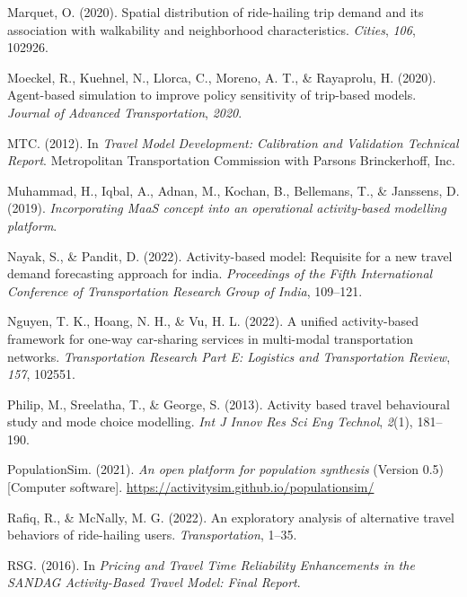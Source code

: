 \documentclass[simple, masters, twoside]{byuthesis}
\newlength{\cslhangindent}
\newlength{\cslentryspacingunit} %
\newenvironment{CSLReferences}[2] %
 {%
  \setlength{\parindent}{0pt}
  \ifodd #1
  \let\oldpar\par
  \def\par{\hangindent=\cslhangindent\oldpar}
  \fi
  \setlength{\parskip}{#2\cslentryspacingunit}
 }%
 {}
\begin{document}
\begin{CSLReferences}{1}{0}
\leavevmode{}%
Marquet, O. (2020). Spatial distribution of ride-hailing trip demand and its association with walkability and neighborhood characteristics. \emph{Cities}, \emph{106}, 102926.

\leavevmode{}%
Moeckel, R., Kuehnel, N., Llorca, C., Moreno, A. T., \& Rayaprolu, H. (2020). Agent-based simulation to improve policy sensitivity of trip-based models. \emph{Journal of Advanced Transportation}, \emph{2020}.

\leavevmode{}%
MTC. (2012). In \emph{Travel Model Development: Calibration and Validation Technical Report}. Metropolitan Transportation Commission with Parsons Brinckerhoff, Inc.

\leavevmode{}%
Muhammad, H., Iqbal, A., Adnan, M., Kochan, B., Bellemans, T., \& Janssens, D. (2019). \emph{Incorporating MaaS concept into an operational activity-based modelling platform}.

\leavevmode{}%
Nayak, S., \& Pandit, D. (2022). Activity-based model: Requisite for a new travel demand forecasting approach for india. \emph{Proceedings of the Fifth International Conference of Transportation Research Group of India}, 109--121.

\leavevmode{}%
Nguyen, T. K., Hoang, N. H., \& Vu, H. L. (2022). A unified activity-based framework for one-way car-sharing services in multi-modal transportation networks. \emph{Transportation Research Part E: Logistics and Transportation Review}, \emph{157}, 102551.

\leavevmode{}%
Philip, M., Sreelatha, T., \& George, S. (2013). Activity based travel behavioural study and mode choice modelling. \emph{Int J Innov Res Sci Eng Technol}, \emph{2}(1), 181--190.

\leavevmode{}%
PopulationSim. (2021). \emph{An open platform for population synthesis} (Version 0.5) {[}Computer software{]}. \url{https://activitysim.github.io/populationsim/}

\leavevmode{}%
Rafiq, R., \& McNally, M. G. (2022). An exploratory analysis of alternative travel behaviors of ride-hailing users. \emph{Transportation}, 1--35.

\leavevmode{}%
RSG. (2016). In \emph{Pricing and Travel Time Reliability Enhancements in the SANDAG Activity-Based Travel Model: Final Report}.


\end{CSLReferences}
\end{document}
